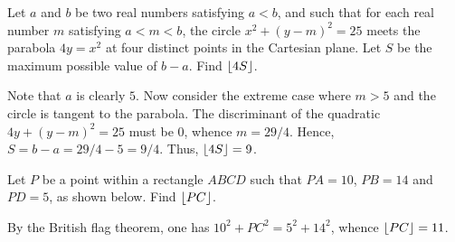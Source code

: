 \clearpage
\begin{question}[9]\label{Q::2022-O-1-4}
    Let $a$ and $b$ be two real numbers satisfying $a < b$, and such that for each real number $m$ satisfying $a < m < b$, the circle $x^2 + (y-m)^2 = 25$ meets the parabola $4y = x^2$ at four distinct points in the Cartesian plane. Let $S$ be the maximum possible value of $b-a$. Find $\left\lfloor 4S \right\rfloor$.
\end{question}
\begin{solution*}
    Note that $a$ is clearly $5$. Now consider the extreme case where $m > 5$ and the circle is tangent to the parabola. The discriminant of the quadratic $4y + (y-m)^2 = 25$ must be 0, whence $m = 29/4$. Hence, $S = b - a = 29/4 - 5 = 9/4$. Thus, $\left\lfloor 4S \right\rfloor = 9$.
\end{solution*}

\begin{question}[11]\label{Q::2022-O-1-5}
    Let $P$ be a point within a rectangle $ABCD$ such that $PA = 10$, $PB = 14$ and $PD = 5$, as shown below. Find $\left\lfloor PC \right\rfloor$.
    
    \begin{center}
    \end{center}
\end{question}
\begin{solution*}
    By the British flag theorem, one has $10^2 + PC^2 = 5^2 + 14^2$, whence $\left\lfloor PC \right\rfloor = 11$.
\end{solution*}

